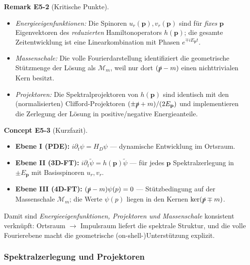 \documentclass[10pt, letterpaper]{article}
\newcommand{\CustomHeading}[3]{%
  \par\medskip\noindent%
  \textbf{#1 #2} \textnormal{(#3)}.\enskip%
}
\newenvironment{REM}[2]{\begin{unitbox}\CustomHeading{Remark}{#1}{#2}}{\end{unitbox}}
\newenvironment{CONC}[2]{\begin{unitbox}\CustomHeading{Concept}{#1}{#2}}{\end{unitbox}}
\begin{document}
\begin{REM}{E5-2}{Kritische Punkte}
\begin{itemize}
\item \emph{Energieeigenfunktionen:}  
Die Spinoren $u_r(\mathbf p),v_r(\mathbf p)$ sind für \emph{fixes} $\mathbf p$ Eigenvektoren des \emph{reduzierten} Hamiltonoperators $h(\mathbf p)$; die gesamte Zeitentwicklung ist eine Linearkombination mit Phasen $e^{\mp iE_{\mathbf p}t}$.
\item \emph{Massenschale:}  
Die volle Fourierdarstellung identifiziert die geometrische Stützmenge der Lösung als $\mathcal M_m$, weil nur dort $(\slashed p-m)$ einen nichttrivialen Kern besitzt.
\item \emph{Projektoren:}  
Die Spektralprojektoren von $h(\mathbf p)$ sind identisch mit den (normalisierten) Clifford-Projektoren $(\pm\slashed p + m)/(2E_{\mathbf p})$ und implementieren die Zerlegung der Lösung in positive/negative Energieanteile.
\end{itemize}
\end{REM}

\begin{CONC}{E5-3}{Kurzfazit}
\begin{itemize}
\item \textbf{Ebene I (PDE):} $i\partial_t\psi=H_D\psi$ — dynamische Entwicklung im Ortsraum.
\item \textbf{Ebene II (3D-FT):} $i\partial_t\tilde\psi=h(\mathbf p)\tilde\psi$ — für jedes $\mathbf p$ Spektralzerlegung in $\pm E_{\mathbf p}$ mit Basisspinoren $u_r,v_r$.
\item \textbf{Ebene III (4D-FT):} $(\slashed p-m)\psi(p)=0$ — Stützbedingung auf der Massenschale $\mathcal M_m$; die Werte $\psi(p)$ liegen in den Kernen $\ker(\slashed p\mp m)$.
\end{itemize}
Damit sind \emph{Energieeigenfunktionen, Projektoren und Massenschale} konsistent verknüpft: 
Ortsraum $\to$ Impulsraum liefert die spektrale Struktur, und die volle Fourierebene macht die geometrische (on-shell-)Unterstützung explizit.
\end{CONC}



\subsubsection{Spektralzerlegung und Projektoren}
\end{document}
